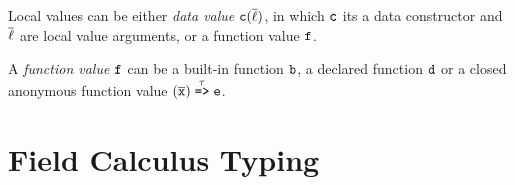 Local values can be either \textit{data value} $\mathtt{c}(\overline{\ell})$, in which $\mathtt{c}$ its a data constructor and $\overline {\ell}$ are local value arguments, or a function value $\mathtt{f}$.

A \textit{function value} $\mathtt{f}$ can be a built-in function $\mathtt{b}$, a declared function $\mathtt{d}$ or a closed anonymous function value $(\overline{\mathtt{x}}) \stackrel{\tau}{\mathrm{\texttt{=>}}} \mathtt{e}$.

\section{Field Calculus Typing}

\begin{figure}[t!]
\end{figure}
